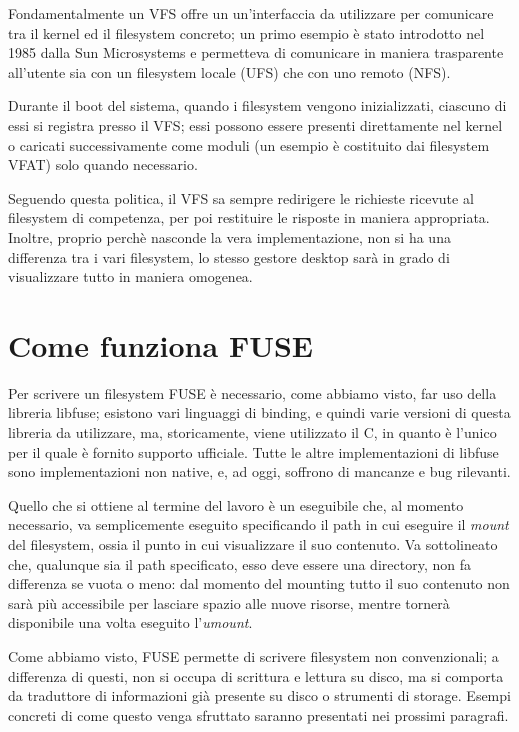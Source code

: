 Fondamentalmente un VFS offre un un'interfaccia da utilizzare per comunicare tra il kernel ed il filesystem concreto; un primo esempio è stato introdotto nel 1985 dalla Sun Microsystems e permetteva di comunicare in maniera trasparente all'utente sia con un filesystem locale (UFS) che con uno remoto (NFS).

Durante il boot del sistema, quando i filesystem vengono inizializzati, ciascuno di essi si registra presso il VFS; essi possono essere presenti direttamente nel kernel o caricati successivamente come moduli (un esempio è costituito dai filesystem VFAT) solo quando necessario. 

Seguendo questa politica, il VFS sa sempre redirigere le richieste ricevute al filesystem di competenza, per poi restituire le risposte in maniera appropriata. Inoltre, proprio perchè nasconde la vera implementazione, non si ha una differenza tra i vari filesystem, lo stesso gestore desktop sarà in grado di visualizzare tutto in maniera omogenea.

\section{Come funziona FUSE}
Per scrivere un filesystem FUSE è necessario, come abbiamo visto, far uso della libreria libfuse; esistono vari linguaggi di binding, e quindi varie versioni di questa libreria da utilizzare, ma, storicamente, viene utilizzato il C, in quanto è l'unico per il quale è fornito supporto ufficiale. Tutte le altre implementazioni di libfuse sono implementazioni non native, e, ad oggi, soffrono di mancanze e bug rilevanti.

Quello che si ottiene al termine del lavoro è un eseguibile che, al momento necessario, va semplicemente eseguito specificando il path in cui eseguire il \emph{mount} del filesystem, ossia il punto in cui visualizzare il suo contenuto. Va sottolineato che, qualunque sia il path specificato, esso deve essere una directory, non fa differenza se vuota o meno: dal momento del mounting tutto il suo contenuto non sarà più accessibile per lasciare spazio alle nuove risorse, mentre tornerà disponibile una volta eseguito l'\emph{umount}.

Come abbiamo visto, FUSE permette di scrivere filesystem non convenzionali; a differenza di questi, non si occupa di scrittura e lettura su disco, ma si comporta da traduttore di informazioni già presente su disco o strumenti di storage. Esempi concreti di come questo venga sfruttato saranno presentati nei prossimi paragrafi.

